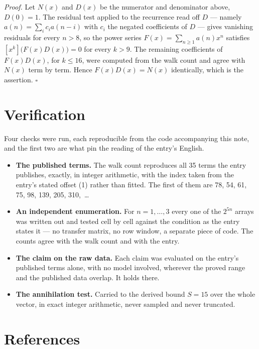 \documentclass[11pt]{article}
\theoremstyle{definition}
\begin{document}
{\itshape Proof.} Let $N(x)$ and $D(x)$ be the numerator and denominator above, $D(0)=1$. The residual test applied to the recurrence read off $D$ --- namely $a(n) = \sum_i c_i a(n-i)$ with $c_i$ the negated coefficients of $D$ --- gives vanishing residuals for every $n > 8$, so the power series $F(x)=\sum_{n\ge 1}a(n)x^n$ satisfies $[x^k]\bigl(F(x)D(x)\bigr) = 0$ for every $k > 9$. The remaining coefficients of $F(x)D(x)$, for $k \le 16$, were computed from the walk count and agree with $N(x)$ term by term. Hence $F(x)D(x) = N(x)$ identically, which is the assertion. $\square$

\section{Verification}

Four checks were run, each reproducible from the code accompanying this note, and the first two are what pin the reading of the entry's English.

\begin{itemize}

\item {\bfseries The published terms.} The walk count reproduces all 35 terms the entry publishes, exactly, in integer arithmetic, with the index taken from the entry's stated offset (1) rather than fitted. The first of them are 78, 54, 61, 75, 98, 139, 205, 310,~\dots

\item {\bfseries An independent enumeration.} For $n = 1,\dots,3$ every one of the $2^{5n}$ arrays was written out and tested cell by cell against the condition as the entry states it --- no transfer matrix, no row window, a separate piece of code. The counts agree with the walk count and with the entry.

\item {\bfseries The claim on the raw data.} Each claim was evaluated on the entry's published terms alone, with no model involved, wherever the proved range and the published data overlap. It holds there.

\item {\bfseries The annihilation test.} Carried to the derived bound $S = 15$ over the whole vector, in exact integer arithmetic, never sampled and never truncated.

\end{itemize}

\section{References}
\end{document}
